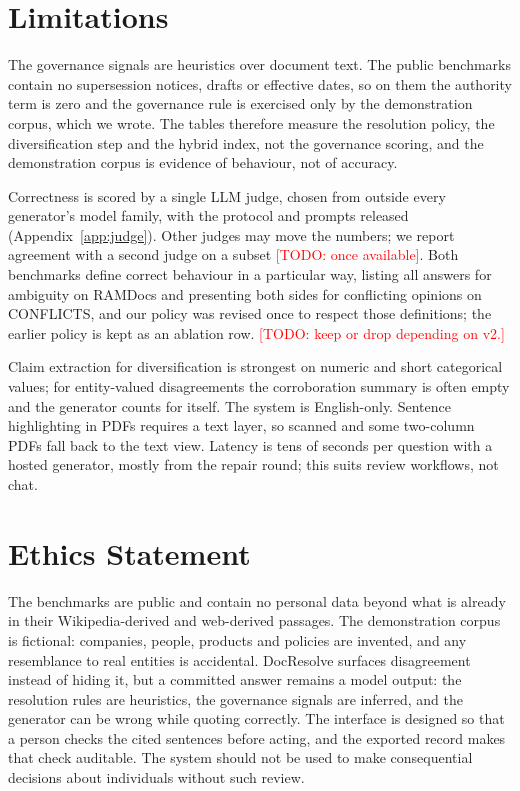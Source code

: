 \documentclass[11pt]{article}
\newcommand{\sysname}{DocResolve}   %
\newcommand{\todo}[1]{\textcolor{red}{[TODO: #1]}}
\begin{document}
\section*{Limitations}
The governance signals are heuristics over document text. The public
benchmarks contain no supersession notices, drafts or effective dates, so
on them the authority term is zero and the governance rule is exercised
only by the demonstration corpus, which we wrote. The tables therefore
measure the resolution policy, the diversification step and the hybrid
index, not the governance scoring, and the demonstration corpus is
evidence of behaviour, not of accuracy.

Correctness is scored by a single LLM judge, chosen from outside every
generator's model family, with the protocol and prompts released
(Appendix~\ref{app:judge}). Other judges may move the numbers; we report
agreement with a second judge on a subset \todo{once available}. Both
benchmarks define correct behaviour in a particular way, listing all
answers for ambiguity on RAMDocs and presenting both sides for conflicting
opinions on CONFLICTS, and our policy was revised once to respect those
definitions; the earlier policy is kept as an ablation row.
\todo{keep or drop depending on v2.}

Claim extraction for diversification is strongest on numeric and
short categorical values; for entity-valued disagreements the corroboration
summary is often empty and the generator counts for itself. The system is
English-only. Sentence highlighting in PDFs requires a text layer, so
scanned and some two-column PDFs fall back to the text view. Latency is
tens of seconds per question with a hosted generator, mostly from the
repair round; this suits review workflows, not chat.

\section*{Ethics Statement}
The benchmarks are public and contain no personal data beyond what is
already in their Wikipedia-derived and web-derived passages. The
demonstration corpus is fictional: companies, people, products and
policies are invented, and any resemblance to real entities is accidental.
\sysname{} surfaces disagreement instead of hiding it, but a committed
answer remains a model output: the resolution rules are heuristics, the
governance signals are inferred, and the generator can be wrong while
quoting correctly. The interface is designed so that a person checks the
cited sentences before acting, and the exported record makes that check
auditable. The system should not be used to make consequential decisions
about individuals without such review.
\end{document}
